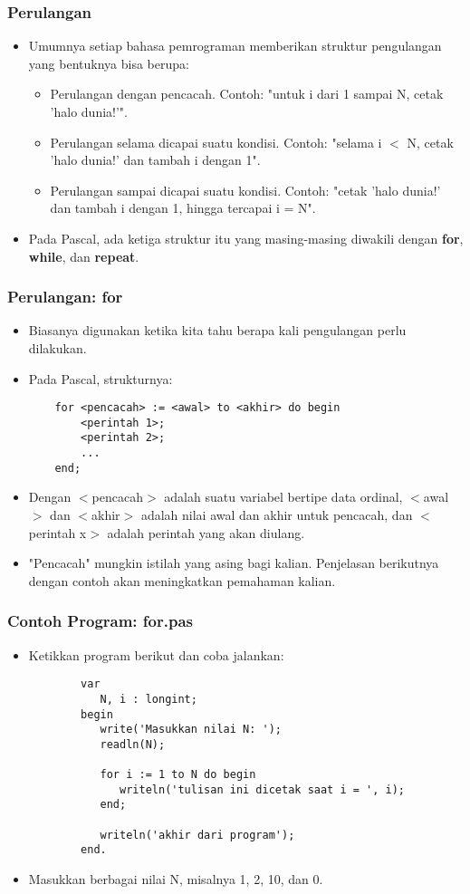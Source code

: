 \documentclass{beamer}
\begin{document}
\begin{frame}
\frametitle{Perulangan}
\begin{itemize}
	\item Umumnya setiap bahasa pemrograman memberikan struktur pengulangan yang bentuknya bisa berupa:
	\begin{itemize}
		\item Perulangan dengan pencacah. Contoh: "untuk i dari 1 sampai N, cetak 'halo dunia!'".
		\item Perulangan selama dicapai suatu kondisi. Contoh: "selama i $<$ N, cetak 'halo dunia!' dan tambah i dengan 1".
		\item Perulangan sampai dicapai suatu kondisi. Contoh: "cetak 'halo dunia!' dan tambah i dengan 1, hingga tercapai i = N".
	\end{itemize}
	\item Pada Pascal, ada ketiga struktur itu yang masing-masing diwakili dengan \alert{\textbf{for}}, \alert{\textbf{while}}, dan \alert{\textbf{repeat}}. 
\end{itemize}
\end{frame}

\begin{frame}[fragile]
\frametitle{Perulangan: for}
\begin{itemize}
	\item Biasanya digunakan ketika kita tahu berapa kali pengulangan perlu dilakukan.
	\item Pada Pascal, strukturnya:
	\begin{lstlisting}
	for <pencacah> := <awal> to <akhir> do begin
	    <perintah 1>;
	    <perintah 2>;
	    ...
	end;
	\end{lstlisting}
	\item Dengan $<$pencacah$>$ adalah suatu variabel bertipe data \alert{ordinal}, $<$awal$>$ dan $<$akhir$>$ adalah nilai awal dan akhir untuk pencacah, dan $<$perintah x$>$ adalah perintah yang akan diulang.
	\item "Pencacah" mungkin istilah yang asing bagi kalian. Penjelasan berikutnya dengan contoh akan meningkatkan pemahaman kalian.
\end{itemize}
\end{frame}

\begin{frame}[fragile]
\frametitle{Contoh Program: for.pas}
\begin{itemize}
	\item Ketikkan program berikut dan coba jalankan:
	\begin{lstlisting}
		var
		   N, i : longint;
		begin
		   write('Masukkan nilai N: ');
		   readln(N);
		
		   for i := 1 to N do begin
		      writeln('tulisan ini dicetak saat i = ', i);
		   end;
		   
		   writeln('akhir dari program');
		end.
	\end{lstlisting}
	\item Masukkan berbagai nilai N, misalnya 1, 2, 10, dan 0.
\end{itemize}
\end{frame}
\end{document}
